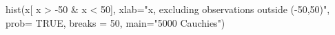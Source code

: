 \begin{Schunk}
\begin{Sinput}
  hist(x[ x > -50 & x < 50], xlab="x, excluding observations outside (-50,50)", prob= TRUE, breaks = 50, main="5000 Cauchies")
\end{Sinput}
\end{Schunk}
